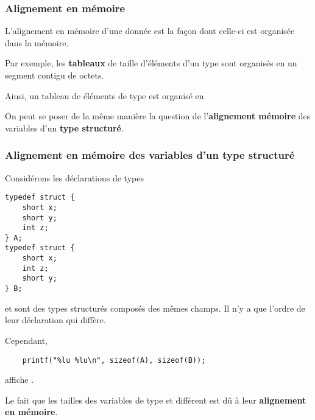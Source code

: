 \begin{frame}[fragile]
\frametitle{Alignement en mémoire}
L'\alert{alignement en mémoire} d'une donnée est la façon dont celle-ci
est organisée dans la mémoire.
\bigskip

Par exemple, les {\bf tableaux} de taille  d'éléments d'un type
 sont organisés en un segment contigu de 
octets.
\medskip

Ainsi, un tableau  de  éléments de type 
est organisé en
\begin{center}
\end{center}
\bigskip

On peut se poser de la même manière la question de l'{\bf alignement
mémoire} des variables d'un {\bf type structuré}.
\end{frame}

\begin{frame}[fragile]
\frametitle{Alignement en mémoire des variables d'un type structuré}
Considérons les déclarations de types
\begin{multicols}{2}
\begin{lstlisting}
typedef struct {
    short x;
    short y;
    int z;
} A;
typedef struct {
    short x;
    int z;
    short y;
} B;
\end{lstlisting}
\end{multicols}
\medskip

 et  sont des types structurés composés des mêmes champs.
Il n'y a que l'ordre de leur déclaration qui diffère.
\medskip

Cependant,
\begin{lstlisting}
    printf("%lu %lu\n", sizeof(A), sizeof(B));
\end{lstlisting}
affiche .
\medskip

Le fait que les tailles des variables de type  et 
diffèrent est dû à leur {\bf alignement en mémoire}.
\end{frame}


